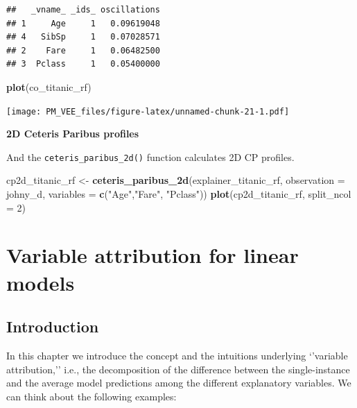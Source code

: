 \documentclass[]{krantz}
\newenvironment{Shaded}{\begin{snugshade}}{\end{snugshade}}
\newcommand{\DataTypeTok}[1]{\textcolor[rgb]{0.13,0.29,0.53}{#1}}
\newcommand{\DecValTok}[1]{\textcolor[rgb]{0.00,0.00,0.81}{#1}}
\newcommand{\KeywordTok}[1]{\textcolor[rgb]{0.13,0.29,0.53}{\textbf{#1}}}
\newcommand{\NormalTok}[1]{#1}
\newcommand{\StringTok}[1]{\textcolor[rgb]{0.31,0.60,0.02}{#1}}
\theoremstyle{definition}
\theoremstyle{definition}
\theoremstyle{definition}
\theoremstyle{remark}
\begin{document}
\begin{verbatim}
##   _vname_ _ids_ oscillations
## 1     Age     1   0.09619048
## 4   SibSp     1   0.07028571
## 2    Fare     1   0.06482500
## 3  Pclass     1   0.05400000
\end{verbatim}

\begin{Shaded}
\begin{Highlighting}[]
\KeywordTok{plot}\NormalTok{(co_titanic_rf)}
\end{Highlighting}
\end{Shaded}

\texttt{[image: PM\_VEE\_files/figure-latex/unnamed-chunk-21-1.pdf]}

\textbf{2D Ceteris Paribus profiles}

And the \texttt{ceteris\_paribus\_2d()} function calculates 2D CP
profiles.

\begin{Shaded}
\begin{Highlighting}[]
\NormalTok{cp2d_titanic_rf <-}\StringTok{ }\KeywordTok{ceteris_paribus_2d}\NormalTok{(explainer_titanic_rf, }\DataTypeTok{observation =}\NormalTok{ johny_d, }
                 \DataTypeTok{variables =} \KeywordTok{c}\NormalTok{(}\StringTok{"Age"}\NormalTok{,}\StringTok{"Fare"}\NormalTok{, }\StringTok{"Pclass"}\NormalTok{))}
\KeywordTok{plot}\NormalTok{(cp2d_titanic_rf, }\DataTypeTok{split_ncol =} \DecValTok{2}\NormalTok{)}
\end{Highlighting}
\end{Shaded}

\hypertarget{variableAttributionMethods}{%
\section{Variable attribution for linear
models}\label{variableAttributionMethods}}

\hypertarget{introduction-2}{%
\subsection{Introduction}\label{introduction-2}}

In this chapter we introduce the concept and the intuitions underlying
`'variable attribution,'' i.e., the decomposition of the difference
between the single-instance and the average model predictions among the
different explanatory variables. We can think about the following
examples:
\end{document}

